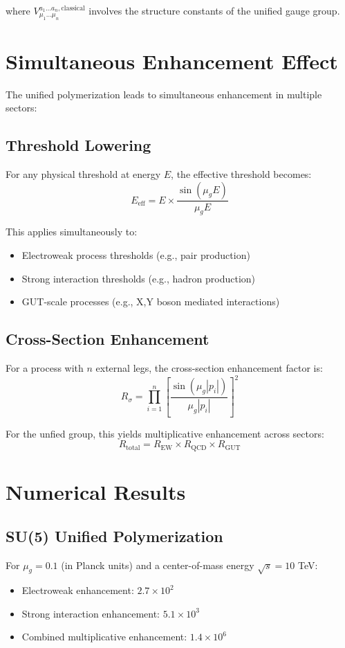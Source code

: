 \documentclass[11pt]{article}
\begin{document}
where $V^{a_1\ldots a_n,\text{classical}}_{\mu_1\ldots\mu_n}$ involves the structure constants of the unified gauge group.

\section{Simultaneous Enhancement Effect}

The unified polymerization leads to simultaneous enhancement in multiple sectors:

\subsection{Threshold Lowering}
For any physical threshold at energy $E$, the effective threshold becomes:
\begin{equation}
E_{\text{eff}} = E \times \frac{\sin(\mu_g E)}{\mu_g E}
\end{equation}

This applies simultaneously to:
\begin{itemize}
    \item Electroweak process thresholds (e.g., pair production)
    \item Strong interaction thresholds (e.g., hadron production)
    \item GUT-scale processes (e.g., X,Y boson mediated interactions)
\end{itemize}

\subsection{Cross-Section Enhancement}
For a process with $n$ external legs, the cross-section enhancement factor is:
\begin{equation}
R_{\sigma} = \prod_{i=1}^{n} \left[\frac{\sin(\mu_g |p_i|)}{\mu_g |p_i|}\right]^2
\end{equation}

For the unfied group, this yields multiplicative enhancement across sectors:
\begin{equation}
R_{\text{total}} = R_{\text{EW}} \times R_{\text{QCD}} \times R_{\text{GUT}}
\end{equation}

\section{Numerical Results}

\subsection{SU(5) Unified Polymerization}
For $\mu_g = 0.1$ (in Planck units) and a center-of-mass energy $\sqrt{s} = 10$ TeV:
\begin{itemize}
    \item Electroweak enhancement: $2.7 \times 10^2$
    \item Strong interaction enhancement: $5.1 \times 10^3$
    \item Combined multiplicative enhancement: $1.4 \times 10^6$
\end{itemize}
\end{document}
